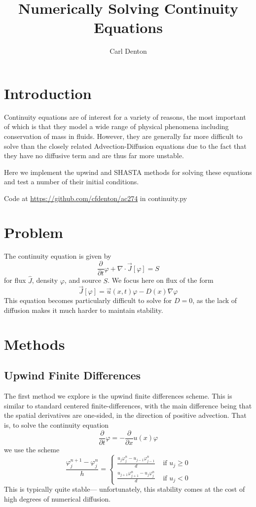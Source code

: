 \documentclass[12pt]{article}
\begin{document}
\title{Numerically Solving Continuity Equations}
\author{Carl Denton}
\maketitle

\section{Introduction}

Continuity equations are of interest for a variety of reasons, the most important of which is that they model a wide range of physical phenomena including conservation of mass in fluids. However, they are generally far more difficult to solve than the closely related Advection-Diffusion equations due to the fact that they have no diffusive term and are thus far more unstable. 

Here we implement the upwind and SHASTA methods for solving these equations and test a number of their initial conditions. 

\vspace{1pc}

\noindent Code at \url{https://github.com/cfdenton/ac274} in continuity.py

\section{Problem}

The continuity equation is given by
\[\frac{\partial}{\partial t} \varphi + \nabla\cdot \vec J[\varphi] = S\]
for flux $\hat J$, density $\varphi$, and source $S$. We focus here on flux of the form
\[\vec J[\varphi] = \vec u(x, t)\varphi - D(x)\nabla \varphi\]
This equation becomes particularly difficult to solve for $D = 0$, as the lack of diffusion makes it much harder to maintain stability.


\section{Methods}

\subsection{Upwind Finite Differences}
The first method we explore is the upwind finite differences scheme. This is similar to standard centered finite-differences, with the main difference being that the spatial derivatives are one-sided, in the direction of positive advection. 
That is, to solve the continuity equation
\[\frac{\partial}{\partial t}\varphi = -\frac{\partial}{\partial x} u(x)\varphi\]
we use the scheme
\[\frac{\varphi_j^{n+1}-\varphi_j^n}{h} = \begin{cases} \frac{u_{j}\varphi_j^n - u_{j-1}\varphi_{j-1}^n}{d} & \text{ if } u_j \geq 0 \\ \frac{u_{j+1}\varphi^n_{j+1} - u_j\varphi^n_j}{d} & \text{ if } u_j < 0\end{cases} \]
This is typically quite stable--- unfortunately, this stability comes at the cost of high degrees of numerical diffusion.
\end{document}

